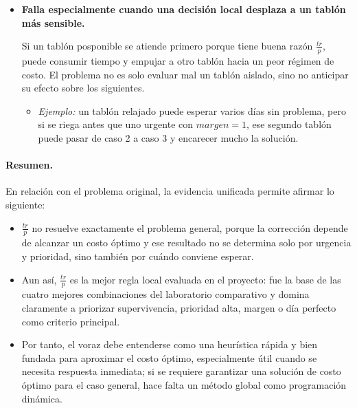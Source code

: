 \documentclass[12pt,a4paper]{article}
\begin{document}
\begin{itemize}
  Eso aparece en perfiles balanceados, largo plazo y sobre todo relajados, donde el margen es amplio. All\'i ya no basta con evitar tardanzas; hay que decidir si conviene usar el tiempo actual o reservarlo para alinear mejor otro tabl\'on con su d\'ia perfecto \(rp\).

  \begin{itemize}
    \setlength{\itemsep}{0.2em}
    \item \textit{Ejemplo:} dos tablones pueden seguir en caso 2 aunque esperen, pero uno tiene \(rp=2\) y el otro \(rp=8\); el mejor orden puede depender de aprovechar ese \(rp\) temprano, no de la raz\'on \(\frac{tr}{p}\).
  \end{itemize}

  \item \textbf{Falla especialmente cuando una decisi\'on local desplaza a un tabl\'on m\'as sensible.}

  Si un tabl\'on posponible se atiende primero porque tiene buena raz\'on \(\frac{tr}{p}\), puede consumir tiempo y empujar a otro tabl\'on hacia un peor r\'egimen de costo. El problema no es solo evaluar mal un tabl\'on aislado, sino no anticipar su efecto sobre los siguientes.

  \begin{itemize}
    \setlength{\itemsep}{0.2em}
    \item \textit{Ejemplo:} un tabl\'on relajado puede esperar varios d\'ias sin problema, pero si se riega antes que uno urgente con \(margen=1\), ese segundo tabl\'on puede pasar de caso 2 a caso 3 y encarecer mucho la soluci\'on.
  \end{itemize}
\end{itemize}

\paragraph{Resumen.}
En relaci\'on con el problema original, la evidencia unificada permite afirmar lo siguiente:

\begin{itemize}
  \item \(\frac{tr}{p}\) no resuelve exactamente el problema general, porque la correcci\'on depende de alcanzar un costo \'optimo y ese resultado no se determina solo por urgencia y prioridad, sino tambi\'en por cu\'ando conviene esperar.
  \item Aun as\'i, \(\frac{tr}{p}\) es la mejor regla local evaluada en el proyecto: fue la base de las cuatro mejores combinaciones del laboratorio comparativo y domina claramente a priorizar supervivencia, prioridad alta, margen o d\'ia perfecto como criterio principal.
  \item Por tanto, el voraz debe entenderse como una heur\'istica r\'apida y bien fundada para aproximar el costo \'optimo, especialmente \'util cuando se necesita respuesta inmediata; si se requiere garantizar una soluci\'on de costo \'optimo para el caso general, hace falta un m\'etodo global como programaci\'on din\'amica.
\end{itemize}
\end{document}
